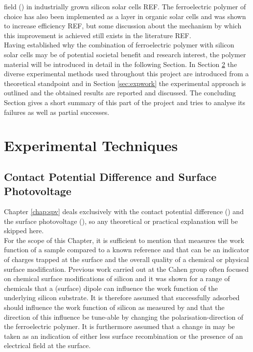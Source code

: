 field (\bfs{}) in industrially grown silicon solar cells REF. The ferroelectric polymer of choice has also been implemented as a  layer in organic solar cells and was shown to increase efficiency REF, but some discussion about the mechanism by which this improvement is achieved still exists in the literature REF.\\
Having established why the combination of ferroelectric polymer with silicon solar cells may be of potential societal benefit and research interest, the polymer material will be introduced in detail in the following Section. In Section \ref{sec:exptech} the diverse experimental methods used throughout this project are introduced from a theoretical standpoint and in Section \ref{sec:expwork} the experimental approach is outlined and the obtained results are reported and discussed. The concluding Section gives a short summary of this part of the project and tries to analyse its failures as well as partial successes.

\section{\pvdf{}} 

\section{Experimental Techniques}
\label{sec:exptech}
\subsection{Contact Potential Difference and Surface Photovoltage}
Chapter \ref{chap:spv} deals exclusively with the contact potential difference (\cpd{}) and the surface photovoltage (\spv{}), so any theoretical or practical explanation will be skipped here.\\
For the scope of this Chapter, it is sufficient to mention that \cpd{} measures the work function of a sample compared to a known reference and that \spv{} can be an indicator of charges trapped at the surface and the overall quality of a chemical or physical surface modification. Previous work carried out at the Cahen group often focused on chemical surface modifications of silicon and it was shown for a range of chemicals that a (surface) dipole can influence the work function of the underlying silicon substrate. It is therefore assumed that successfully adsorbed \pvdf{} should influence the work function of silicon as measured by \cpd{} and that the direction of this influence be tune-able by changing the polarisation-direction of the ferroelectric polymer. It is furthermore assumed that a change in \spv{} may be taken as an indication of either less surface recombination or the presence of an electrical field at the surface.

